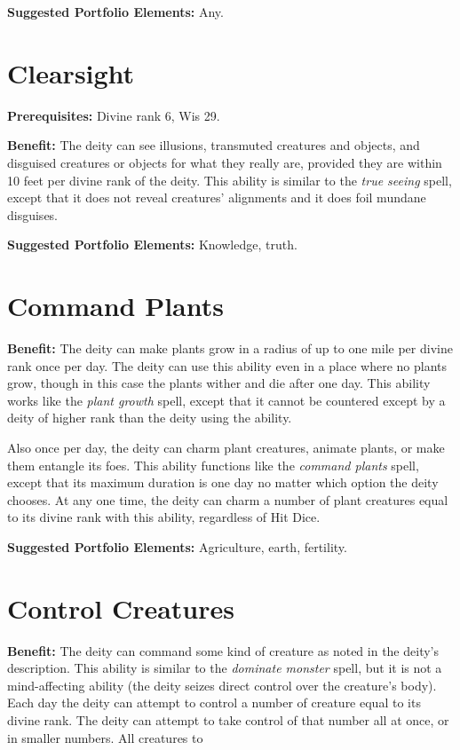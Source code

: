 \documentclass{article}
\begin{document}
\textbf{Suggested Portfolio Elements:} Any.

\vspace{12pt}
\section*{Clearsight}

\textbf{Prerequisites:} Divine rank 6, Wis 29.

\textbf{Benefit:} The deity can see illusions, transmuted creatures and objects, 
and disguised creatures or objects for what they really are, provided they are 
within 10 feet per divine rank of the deity. This ability is similar to the \textit{true 
seeing }spell, except that it does not reveal creatures' alignments and it does 
foil mundane disguises.

\textbf{Suggested Portfolio Elements:} Knowledge, truth.

\vspace{12pt}
\section*{Command Plants}

\textbf{Benefit:} The deity can make plants grow in a radius of up to one mile 
per divine rank once per day. The deity can use this ability even in a place where 
no plants grow, though in this case the plants wither and die after one day. This 
ability works like the \textit{plant growth }spell, except that it cannot be countered 
except by a deity of higher rank than the deity using the ability. 

Also once per day, the deity can charm plant creatures, animate plants, or make 
them entangle its foes. This ability functions like the \textit{command plants 
}spell, except that its maximum duration is one day no matter which option the 
deity chooses. At any one time, the deity can charm a number of plant creatures 
equal to its divine rank with this ability, regardless of Hit Dice.

\textbf{Suggested Portfolio Elements:} Agriculture, earth, fertility.

\vspace{12pt}
\section*{Control Creatures}

\textbf{Benefit:} The deity can command some kind of creature as noted in the deity's 
description. This ability is similar to the \textit{dominate monster }spell, but 
it is not a mind-affecting ability (the deity seizes direct control over the creature's 
body). Each day the deity can attempt to control a number of creature equal to 
its divine rank. The deity can attempt to take control of that number all at once, 
or in smaller numbers. All creatures to
\end{document}

